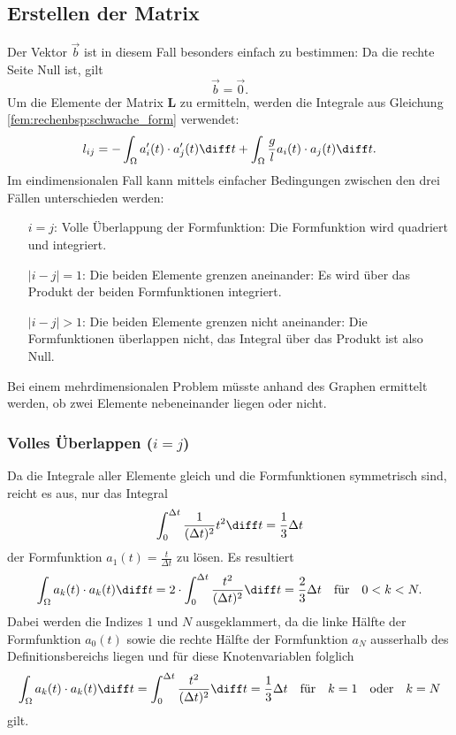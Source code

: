\subsection{Erstellen der Matrix}
Der Vektor $\vec{b}$ ist in diesem Fall besonders einfach zu bestimmen: Da die rechte Seite Null ist, gilt
\begin{equation}
    \vec{b} = \vec{0}.
\end{equation}
Um die Elemente der Matrix $\mathbf{L}$ zu ermitteln, werden die Integrale aus Gleichung \ref{fem:rechenbsp:schwache_form} verwendet:
\begin{equation}
    l_{ij} = - \int_\Omega a_i'(t) \cdot a_j'(t) \diff t + \int_\Omega \frac{g}{l} a_i(t) \cdot a_j(t) \diff t.
\end{equation}
Im eindimensionalen Fall kann mittels einfacher Bedingungen zwischen den drei Fällen unterschieden werden:
\begin{itemize}
    \item[$i = j$:] Volle Überlappung der Formfunktion: Die Formfunktion wird quadriert und integriert. 
    \item[$|i - j| = 1$:] Die beiden Elemente grenzen aneinander: Es wird über das Produkt der beiden Formfunktionen integriert.
    \item[$|i - j| > 1$:] Die beiden Elemente grenzen nicht aneinander: Die Formfunktionen überlappen nicht, das Integral über das Produkt ist also Null.
\end{itemize}
Bei einem mehrdimensionalen Problem müsste anhand des Graphen ermittelt werden, ob zwei Elemente nebeneinander liegen oder nicht.

\subsubsection{Volles Überlappen ($i = j$)}
Da die Integrale aller Elemente gleich und die Formfunktionen symmetrisch sind, reicht es aus, nur das Integral
\begin{equation}
    \int_{0}^{\Delta t} \frac{1}{(\Delta t)^2} t^2 \diff t = \frac{1}{3} \Delta t
\end{equation}
der Formfunktion $ a_1(t) = \frac{t}{\Delta t} $ zu lösen.
Es resultiert
\begin{equation}
    \int_\Omega a_k(t) \cdot a_k(t) \diff t = 2 \cdot \int_{0}^{\Delta t} \frac{t^2}{(\Delta t)^2} \diff t = \frac{2}{3} \Delta t \quad \text{für} \quad 0 < k < N.
\end{equation}
Dabei werden die Indizes $1$ und $N$ ausgeklammert, da die linke Hälfte der Formfunktion $a_0(t)$ sowie die rechte Hälfte der Formfunktion $a_N$ ausserhalb des Definitionsbereichs liegen und für diese Knotenvariablen folglich
\begin{equation}
    \int_\Omega a_k(t) \cdot a_k(t) \diff t = \int_{0}^{\Delta t} \frac{t^2}{(\Delta t)^2} \diff t = \frac{1}{3} \Delta t \quad \text{für} \quad k = 1 \quad \text{oder} \quad k = N
\end{equation}
gilt.

